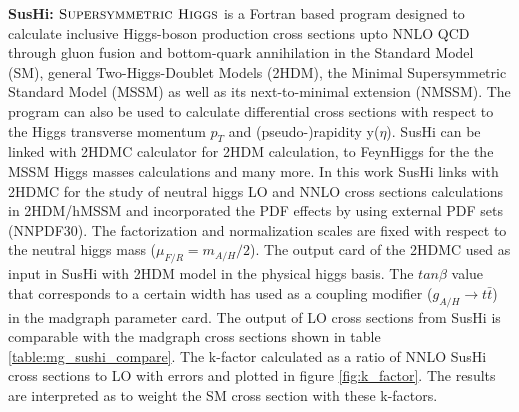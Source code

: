 \textbf{SusHi:} $\textsc{Supersymmetric Higgs}$ \cite{sushi} is a Fortran based program designed to calculate inclusive Higgs-boson production cross sections upto NNLO QCD through gluon fusion and bottom-quark annihilation in the Standard Model (SM), general Two-Higgs-Doublet Models (2HDM), the Minimal Supersymmetric Standard Model (MSSM) as well as its next-to-minimal extension (NMSSM). The program can also be used to calculate differential cross sections with respect to the Higgs transverse momentum $p_{T}$ and (pseudo-)rapidity y($\eta$). SusHi can be linked with 2HDMC calculator for 2HDM calculation, to FeynHiggs for the the MSSM Higgs masses calculations and many more. In this work SusHi links with 2HDMC for the study of neutral higgs LO and NNLO cross sections calculations in 2HDM/hMSSM and incorporated the PDF effects by using external PDF sets (NNPDF30). The factorization and normalization scales are fixed with respect to the neutral higgs mass ($\mu_{F/R} = m_{A/H}/2$). The output card of the 2HDMC used as input in SusHi with 2HDM model in the physical higgs basis. The $tan\beta$ value that corresponds to a certain width has used as a coupling modifier ($g_{A/H}\rightarrow t\bar{t}$) in the madgraph parameter card. The output of LO cross sections from SusHi is comparable with the madgraph cross sections shown in table \ref{table:mg_sushi_compare}. The k-factor calculated as a ratio of NNLO SusHi cross sections to LO with errors and plotted in figure \ref{fig:k_factor}. The results are interpreted as to weight the SM cross section with these k-factors. 
